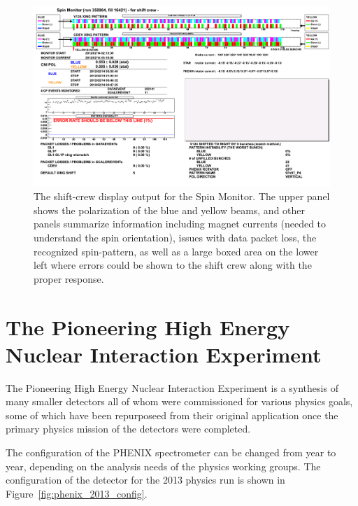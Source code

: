 \begin{figure}
  \centering
  \includegraphics[width=\linewidth]{./figures/SPINMON_shift_358904.png}
  \caption{
    The shift-crew display output for the Spin Monitor. The upper panel shows
    the polarization of the blue and yellow beams, and other panels summarize
    information including magnet currents (needed to understand the spin
    orientation), issues with data packet loss, the recognized spin-pattern, as
    well as a large boxed area on the lower left where errors could be shown to
    the shift crew along with the proper response.
  }
  \label{fig:spin_monitor}

\end{figure}


\clearpage
\section{The Pioneering High Energy Nuclear Interaction Experiment}
\label{sec:PHENIX}
The Pioneering High Energy Nuclear Interaction Experiment is a synthesis of many
smaller detectors all of whom were commissioned for various physics goals, some
of which have been repurposeed from their original application once the primary
physics mission of the detectors were completed.

The configuration of the PHENIX spectrometer can be changed from year to year,
depending on the analysis needs of the physics working groups. The configuration
of the detector for the 2013 physics run is shown in
Figure~\ref{fig:phenix_2013_config}.

